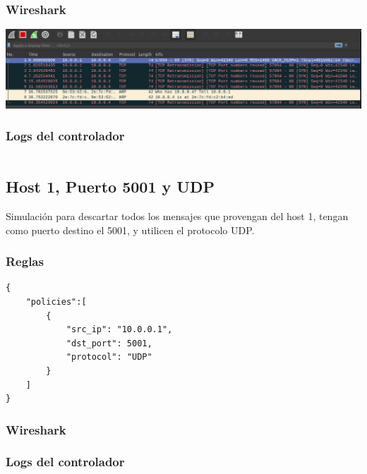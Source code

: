 \documentclass{article}
\begin{document}
\subsubsection{Wireshark}
\begin{center}
\includegraphics[scale=0.35]{bloq_80_port.png}
\end{center}



\subsubsection{Logs del controlador}
\begin{center}
  \inputminted[fontsize=\footnotesize]{text}{informe/logs/Port_80_Log.txt}
\end{center}

\subsection{Host 1, Puerto 5001 y UDP}
Simulación para descartar todos los mensajes que provengan del host 1, tengan como puerto destino el 5001, y utilicen el protocolo UDP.
\subsubsection{Reglas}
\begin{verbatim}
{
    "policies":[
        {
            "src_ip": "10.0.0.1",
            "dst_port": 5001,
            "protocol": "UDP"
        }
    ]
}
\end{verbatim}

\subsubsection{Wireshark}
\begin{center}
\end{center}

\subsubsection{Logs del controlador}
\begin{center}
\end{center}
\end{document}
